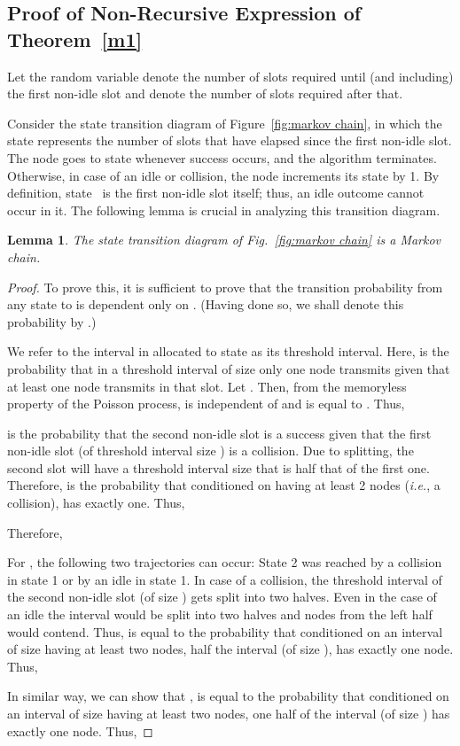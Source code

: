 \documentclass[12pt,draftcls,peerreview, onecolumn]{IEEEtran}
\newtheorem{lemma}{{\bf Lemma}}
\newcommand{\ie}{{\it i.e.}}
\begin{document}
\subsection{Proof of Non-Recursive Expression of Theorem~\ref{m1}}
\label{proof of m2}
Let the random variable  denote the number of slots required until (and including) the first non-idle slot and  denote the number of slots required after that.

  Consider the state transition diagram of Figure~\ref{fig:markov
    chain}, in which the state represents the number of slots that
  have elapsed since the first non-idle slot. The node goes to state
   whenever success occurs, and the algorithm terminates.
  Otherwise, in case of an idle or collision, the node increments its
  state by 1. By definition, state~ is the first non-idle slot
  itself; thus, an idle outcome cannot occur in it. The following
  lemma is crucial in analyzing this transition diagram.
\begin{lemma}
The state transition diagram of Fig.~\ref{fig:markov chain} is a Markov chain.
\label{lem:markov}
\end{lemma}
\begin{proof}
To prove this, it is sufficient to prove that the
  transition probability from any state  to  is dependent
  only on . (Having done so, we shall denote this probability by .)

  
  We refer to the interval in  allocated to state  as its
  threshold interval.  Here,  is the probability that in a
  threshold interval of size  only one node transmits given that
  at least one node transmits in that slot. Let .
  Then, from the memoryless property of the Poisson process,
   is independent of  and is equal to . Thus,

 is the probability that the second non-idle slot is a
 success given that the first non-idle slot (of threshold interval
 size ) is a collision. Due to splitting, the second slot will
 have a threshold interval size that is half that of the first one.
 Therefore,  is the probability that conditioned on 
 having at least 2 nodes (\ie, a collision),  has exactly
 one. Thus,

Therefore,


  For , the following two trajectories can occur: State 2 was
  reached by a collision in state 1 or by an idle in state 1. In case
  of a collision, the threshold interval of the second non-idle slot
  (of size ) gets split into two halves. Even in the case of an
  idle the interval would be split into two halves and nodes from the
  left half would contend.  Thus,  is equal to the probability
  that conditioned on an interval of size  having at least two
  nodes, half the interval (of size ), has exactly one node. Thus,


In similar way, we can show that , is equal to
the probability that conditioned on an interval of size
 having at least two nodes, one half of the interval (of size
) has exactly one node. Thus,
    
\end{proof}
\end{document}
